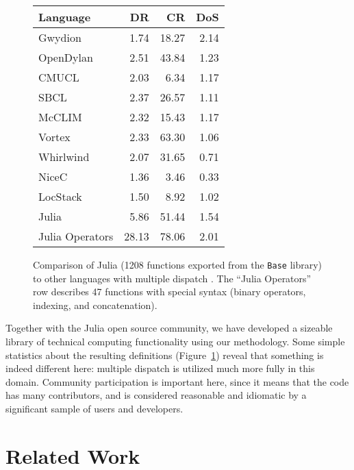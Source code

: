 \documentclass[12pt]{article}
\begin{document}
\begin{figure}
\label{dispatchratios}
\begin{center}
\begin{tabular}{|l|r|r|r|}\hline
Language & DR & CR & DoS \\
\hline \hline
Gwydion    & 1.74 & 18.27 & 2.14 \\
\hline
OpenDylan  & 2.51 & 43.84 & 1.23 \\
\hline
CMUCL      & 2.03 &  6.34 & 1.17 \\
\hline
SBCL       & 2.37 & 26.57 & 1.11 \\
\hline
McCLIM     & 2.32 & 15.43 & 1.17 \\
\hline
Vortex     & 2.33 & 63.30 & 1.06 \\
\hline
Whirlwind  & 2.07 & 31.65 & 0.71 \\
\hline
NiceC      & 1.36 &  3.46 & 0.33 \\
\hline
LocStack   & 1.50 &  8.92 & 1.02 \\
\hline
Julia      & 5.86 & 51.44 & 1.54 \\
\hline
Julia Operators & 28.13 & 78.06 & 2.01 \\
\hline
\end{tabular}
\end{center}
\caption{
Comparison of Julia (1208 functions exported from the \texttt{Base} library)
to other languages with multiple dispatch \cite{multipledispatch}.
The ``Julia Operators'' row describes 47 functions with special syntax
(binary operators, indexing, and concatenation).
}
\end{figure}

Together with the Julia open source community, we have developed a sizeable
library of technical computing functionality using our methodology. Some
simple statistics about the resulting definitions (Figure~\ref{dispatchratios})
reveal that something is indeed different here: multiple dispatch is
utilized much more fully in this domain. Community participation is
important here, since it means that the code has many contributors, and
is considered reasonable and idiomatic by a significant sample of users
and developers.



\section{Related Work}
\end{document}
